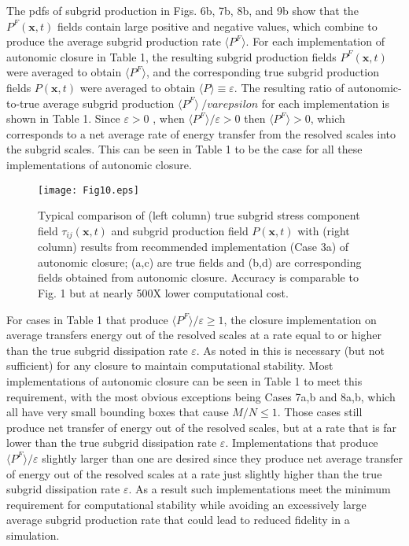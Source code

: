 The pdfs of subgrid production in Figs. 6b, 7b, 8b, and 9b show that the $P^F(\mathbf{x},t)$  fields contain large positive and negative values, which combine to produce the average subgrid production rate $\langle P^F \rangle$. For each implementation of autonomic closure in Table 1, the resulting  subgrid production fields $P^F(\mathbf{x},t)$  were averaged to obtain $\langle P^F \rangle$, and the corresponding true subgrid production fields $P(\mathbf{x},t)$   were averaged to obtain $\langle P \rangle \equiv \varepsilon$. The resulting ratio of autonomic-to-true average subgrid production $\langle P^F \rangle\ /varepsilon$  for each implementation is shown in Table 1. Since $\varepsilon > 0$ , when  $\langle P^F\rangle/ \varepsilon > 0$  then $\langle P^F \rangle > 0$, which corresponds to a net average rate of energy transfer from the resolved scales into the subgrid scales.  This can be seen in Table 1 to be the case for all these implementations of autonomic closure. 

%
\begin{figure}
	\begin{center}
	\texttt{[image: Fig10.eps]}
	\caption{Typical comparison of (left column) true subgrid stress component field $\tau_{ij}(\mathbf{x},t)$ and subgrid production field $P(\mathbf{x},t)$ with (right column) results from recommended implementation (Case 3a) of autonomic closure; (a,c) are true fields and (b,d) are corresponding fields obtained from autonomic closure. Accuracy is comparable to Fig. 1 but at nearly 500X lower computational cost.}
	\label{F:10}
	\end{center}
\end{figure}
%
%

For cases in Table 1 that produce $\langle P^F \rangle/\varepsilon \geq 1$, the closure implementation on average transfers energy out of the resolved scales at a rate equal to or higher than the true subgrid dissipation rate $\varepsilon$. As noted in  this is necessary (but not sufficient) for any closure to maintain computational stability.  Most implementations of autonomic closure can be seen in Table 1 to meet this requirement, with the most obvious exceptions being Cases 7a,b and 8a,b, which all have very small bounding boxes that cause $M/N \leq 1$. Those cases still produce net transfer of energy out of the resolved scales, but at a rate that is far lower than the true subgrid dissipation rate $\varepsilon$. Implementations that produce  $\langle P^F \rangle/\varepsilon$  slightly larger than one are desired since they produce net average transfer of energy out of the resolved scales at a rate just slightly higher than the true subgrid dissipation rate $\varepsilon$. As a result such implementations meet the minimum requirement for computational stability while avoiding an excessively large average subgrid production rate that could lead to reduced fidelity in a simulation. 

